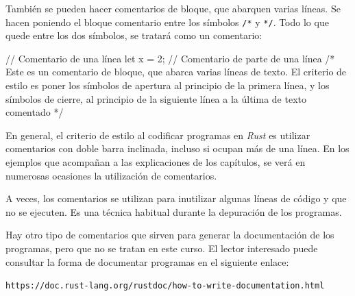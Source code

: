 También se pueden hacer comentarios de bloque, que abarquen varias líneas. Se hacen poniendo el bloque comentario entre los símbolos \texttt{/*} y \texttt{*/}. Todo lo que quede entre los dos símbolos, se tratará como un comentario:

\begin{Codigo}
   // Comentario de una línea
   let x = 2; // Comentario de parte de una línea
   /* Este es un comentario de bloque,
   que abarca varias líneas de texto.
   El criterio de estilo es poner los símbolos
   de apertura al principio de la primera línea,
   y los símbolos de cierre, al principio de la
   siguiente línea a la última de texto comentado
   */
\end{Codigo}

En general, el criterio de estilo al codificar programas en \textit{Rust} es utilizar comentarios con doble barra inclinada, incluso si ocupan más de una línea. En los ejemplos que acompañan a las explicaciones de los capítulos, se verá en numerosas ocasiones la utilización de comentarios.

A veces, los comentarios se utilizan para inutilizar algunas líneas de código y que no se ejecuten. Es una técnica habitual durante la depuración de los programas.

Hay otro tipo de comentarios que sirven para generar la documentación de los programas, pero que no se tratan en este curso. El lector interesado puede consultar la forma de documentar programas en el siguiente enlace:


{\centering\small \texttt{https://doc.rust-lang.org/rustdoc/how-to-write-documentation.html} \par}

